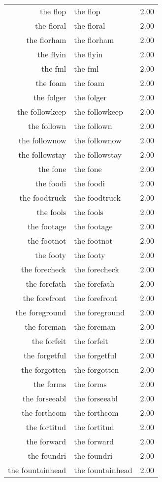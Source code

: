 \begin{table}[ht]
\begin{tabular}{rlr}
  the flop & the flop & 2.00 \\ 
  the floral & the floral & 2.00 \\ 
  the florham & the florham & 2.00 \\ 
  the flyin & the flyin & 2.00 \\ 
  the fml & the fml & 2.00 \\ 
  the foam & the foam & 2.00 \\ 
  the folger & the folger & 2.00 \\ 
  the followkeep & the followkeep & 2.00 \\ 
  the follown & the follown & 2.00 \\ 
  the follownow & the follownow & 2.00 \\ 
  the followstay & the followstay & 2.00 \\ 
  the fone & the fone & 2.00 \\ 
  the foodi & the foodi & 2.00 \\ 
  the foodtruck & the foodtruck & 2.00 \\ 
  the fools & the fools & 2.00 \\ 
  the footage & the footage & 2.00 \\ 
  the footnot & the footnot & 2.00 \\ 
  the footy & the footy & 2.00 \\ 
  the forecheck & the forecheck & 2.00 \\ 
  the forefath & the forefath & 2.00 \\ 
  the forefront & the forefront & 2.00 \\ 
  the foreground & the foreground & 2.00 \\ 
  the foreman & the foreman & 2.00 \\ 
  the forfeit & the forfeit & 2.00 \\ 
  the forgetful & the forgetful & 2.00 \\ 
  the forgotten & the forgotten & 2.00 \\ 
  the forms & the forms & 2.00 \\ 
  the forseeabl & the forseeabl & 2.00 \\ 
  the forthcom & the forthcom & 2.00 \\ 
  the fortitud & the fortitud & 2.00 \\ 
  the forward & the forward & 2.00 \\ 
  the foundri & the foundri & 2.00 \\ 
  the fountainhead & the fountainhead & 2.00 \\ 

\end{tabular}
\end{table}
